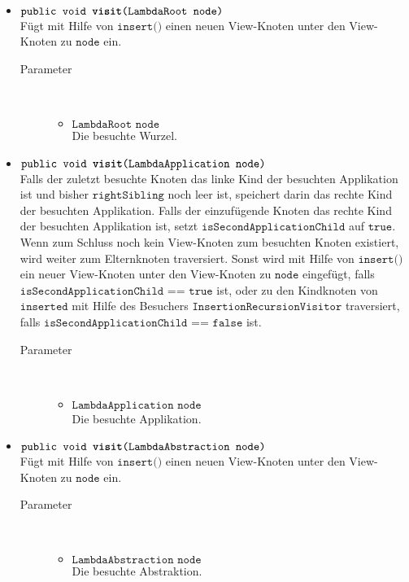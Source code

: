 \begin{description}
\begin{itemize}
		\item $\texttt{public void \textbf{visit}(LambdaRoot node)}$ \\ Fügt mit Hilfe von $\texttt{insert()}$ einen neuen View-Knoten unter den View-Knoten zu $\texttt{node}$ ein.
		\begin{description}
			\item[Parameter] \hfill \\
			\vspace{-.8cm}
			\begin{itemize}
				\item $\texttt{LambdaRoot node}$ \\ Die besuchte Wurzel.
			\end{itemize}
		\end{description}
				
		\item $\texttt{public void \textbf{visit}(LambdaApplication node)}$ \\ Falls der zuletzt besuchte Knoten das linke Kind der besuchten Applikation ist und bisher $\texttt{rightSibling}$ noch leer ist, speichert darin das rechte Kind der besuchten Applikation. Falls der einzufügende Knoten das rechte Kind der besuchten Applikation ist, setzt $\texttt{isSecondApplicationChild}$ auf $\texttt{true}$. Wenn zum Schluss noch kein View-Knoten zum besuchten Knoten existiert, wird weiter zum Elternknoten traversiert. Sonst wird mit Hilfe von $\texttt{insert()}$ ein neuer View-Knoten unter den View-Knoten zu $\texttt{node}$ eingefügt, falls $\texttt{isSecondApplicationChild == true}$ ist, oder zu den Kindknoten von $\texttt{inserted}$ mit Hilfe des Besuchers $\texttt{InsertionRecursionVisitor}$ traversiert, falls $\texttt{isSecondApplicationChild == false}$ ist.
		\begin{description}
			\item[Parameter] \hfill \\
			\vspace{-.8cm}
			\begin{itemize}
				\item $\texttt{LambdaApplication node}$ \\ Die besuchte Applikation.
			\end{itemize}
		\end{description}
		
		\item $\texttt{public void \textbf{visit}(LambdaAbstraction node)}$ \\ Fügt mit Hilfe von $\texttt{insert()}$ einen neuen View-Knoten unter den View-Knoten zu $\texttt{node}$ ein.
		\begin{description}
			\item[Parameter] \hfill \\
			\vspace{-.8cm}
			\begin{itemize}
				\item $\texttt{LambdaAbstraction node}$ \\ Die besuchte Abstraktion.
			\end{itemize}
		\end{description}
		

\end{itemize}
\end{description}
